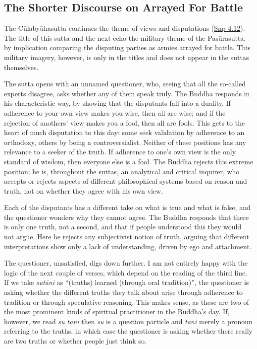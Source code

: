 \documentclass[12pt,openany]{book}%
\begin{document}
\subsection*{The Shorter Discourse on Arrayed For Battle}

The \textsanskrit{Cūḷabyūhasutta} continues the theme of views and disputations (\href{https://suttacentral.net/snp4.12/en/sujato}{Snp 4.12}). The title of this sutta and the next echo the military theme of the \textsanskrit{Pasūrasutta}, by implication comparing the disputing parties as armies arrayed for battle. This military imagery, however, is only in the titles and does not appear in the suttas themselves.

The sutta opens with an unnamed questioner, who, seeing that all the so-called experts disagree, asks whether any of them speak truly. The Buddha responds in his characteristic way, by showing that the disputants fall into a duality. If adherence to your own view makes you wise, then all are wise; and if the rejection of anothers’ view makes you a fool, then all are fools. This gets to the heart of much disputation to this day: some seek validation by adherence to an orthodoxy, others by being a controversialist. Neither of these positions has any relevance to a seeker of the truth. If adherence to one’s own view is the only standard of wisdom, then everyone else is a fool. The Buddha rejects this extreme position; he is, throughout the suttas, an analytical and critical inquirer, who accepts or rejects aspects of different philosophical systems based on reason and truth, not on whether they agree with his own view.

Each of the disputants has a different take on what is true and what is false, and the questioner wonders why they cannot agree. The Buddha responds that there is only one truth, not a second, and that if people understood this they would not argue. Here he rejects any subjectivist notion of truth, arguing that different interpretations show only a lack of understanding, driven by ego and attachment.

The questioner, unsatisfied, digs down further. I am not entirely happy with the logic of the next couple of verses, which depend on the reading of the third line. If we take \textit{\textsanskrit{sutāni}} as “(truths) learned (through oral tradition)”, the questioner is asking whether the different truths they talk about arise through adherence to tradition or through speculative reasoning. This makes sense, as these are two of the most prominent kinds of spiritual practitioner in the Buddha’s day. If, however, we read \textit{su \textsanskrit{tāni}} then \textit{su} is a question particle and \textit{\textsanskrit{tāni}} merely a pronoun referring to the truths, in which case the questioner is asking whether there really are two truths or whether people just think so.
\end{document}
